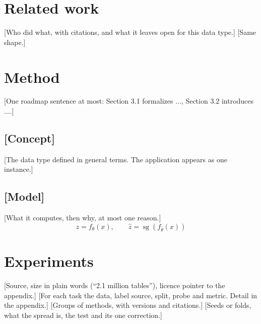 \documentclass{article}
\newcommand{\sg}{\operatorname{sg}}               %
\begin{document}
\section{Related work}\label{sec:related}
 [Who did what, with citations, and what it leaves open for this data type.]
 [Same shape.]

\section{Method}\label{sec:method}
[One roadmap sentence at most: Section 3.1 formalizes ..., Section 3.2 introduces ....]
\subsection{[Concept]}\label{sec:concept}
[The data type defined in general terms. The application appears as one instance.]
\subsection{[Model]}\label{sec:model}
 [What it computes, then why, at most one reason.]
\begin{equation}
  z = f_\theta(x), \qquad \hat z = \sg\!\left(f_{\bar\theta}(x)\right) \label{eq:example}
\end{equation}

\section{Experiments}\label{sec:exp}
 [Source, size in plain words (``2.1 million tables''), licence pointer to the appendix.]
 [For each task the data, label source, split, probe and metric. Detail in the appendix.]
 [Groups of methods, with versions and citations.]
 [Seeds or folds, what the spread is, the test and its one correction.]
\end{document}
